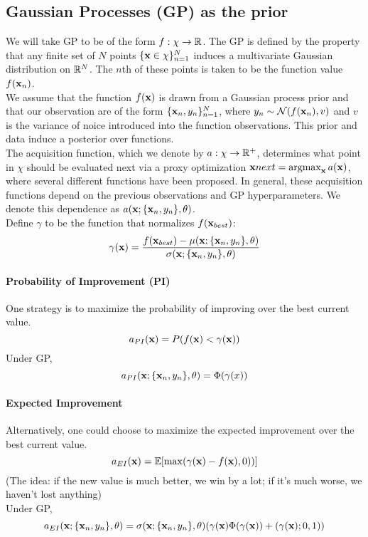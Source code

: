 \documentclass[11pt]{article}
\begin{document}
\subsection{Gaussian Processes (GP) as the prior}
We will take GP to be of the form $f: \chi \rightarrow \mathbb{R}$. The GP is defined by the property that any finite set of $N$ points $\{\textbf{x} \in \chi\}_{n=1}^N$ induces a multivariate Gaussian distribution on $\mathbb{R}^N$. The $n$th of these points is taken to be the function value $f(\textbf{x}_n)$.\\
We assume that the function $f(\textbf{x})$ is drawn from a Gaussian process prior and that our observation are of the form $\{\textbf{x}_n, y_n\}_{n=1}^N$, where $y_n \sim \mathcal{N}(f(\textbf{x}_n), v)$ and $v$ is the variance of noice introduced into the function observations. This prior and data induce a posterior over functions. \\
The acquisition function, which we denote by $a: \chi \rightarrow \mathbb{R}^+$, determines what point in $\chi$ should be evaluated next via a proxy optimization $\textbf{x}{next} = \operatorname*{argmax}_{\textbf{x}} a(\textbf{x})$, where several different functions have been proposed. In general, these acquisition functions depend on the previous observations and GP hyperparameters. We denote this dependence as $a(\textbf{x}; \{\textbf{x}_n, y_n\}, \theta)$.\\
Define $\gamma$ to be the function that normalizes $f(\textbf{x}_{best})$:
$$\gamma(\textbf{x}) = \frac{f(\textbf{x}_{best}) - \mu(\textbf{x}; \{\textbf{x}_n, y_n\}, \theta)}{\sigma(\textbf{x}; \{\textbf{x}_n, y_n\}, \theta)}$$
\paragraph{Probability of Improvement (PI)} One strategy is to maximize the probability of improving over the best current value. \\
$$a_{PI}(\textbf{x}) = P(f(\textbf{x}) <  \gamma(\textbf{x}))$$
Under GP,
$$a_{PI}(\textbf{x}; \{\textbf{x}_n, y_n\}, \theta) = \Phi(\gamma(x))$$
\paragraph{Expected Improvement} Alternatively, one could choose to maximize the expected improvement over the best current value. \\
$$a_{EI}(\textbf{x}) = \mathbb{E}[{\max(\gamma(\textbf{x}) - f(\textbf{x}), 0))}]$$
(The idea: if the new value is much better, we win by a lot; if it's much worse, we haven't lost anything)\\
Under GP,
$$a_{EI}(\textbf{x}; \{\textbf{x}_n, y_n\}, \theta) = \sigma(\textbf{x}; \{\textbf{x}_n, y_n\}, \theta)(\gamma(\textbf{x}) \Phi(\gamma(\textbf{x})) + \mathcal{(}\gamma(\textbf{x}); 0, 1))$$
\end{document}

